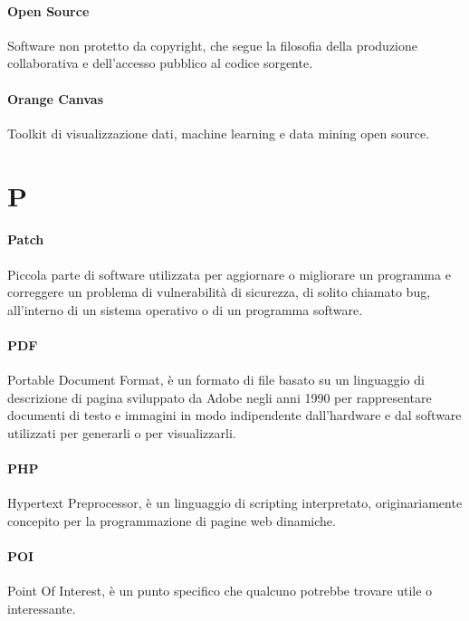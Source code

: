 \documentclass[]{article}
\begin{document}
	\paragraph*{Open Source}
	Software non protetto da copyright, che segue la filosofia della produzione collaborativa e dell'accesso pubblico al codice sorgente.
	
	\paragraph*{Orange Canvas}
	Toolkit di visualizzazione dati, machine learning e data mining open source.
	
	\newpage
	
	\section*{P}
	
	\paragraph*{Patch}
	Piccola parte di software utilizzata per aggiornare o migliorare un programma e correggere un problema di vulnerabilità di sicurezza, di solito chiamato bug, all'interno di un sistema operativo o di un programma software.
	
	\paragraph*{PDF}
	Portable Document Format, è un formato di file basato su un linguaggio di descrizione di pagina sviluppato da Adobe negli anni 1990 per rappresentare documenti di testo e immagini in modo indipendente dall'hardware e dal software utilizzati per generarli o per visualizzarli.
	
	\paragraph*{PHP}
	Hypertext Preprocessor, è un linguaggio di scripting interpretato, originariamente concepito per la programmazione di pagine web dinamiche.
	
	\paragraph*{POI}
	Point Of Interest, è un punto specifico che qualcuno potrebbe trovare utile o interessante.
	
\end{document}
